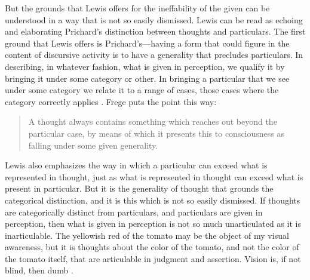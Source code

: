 \documentclass[12pt]{article}
\begin{document}
But the grounds that Lewis offers for the ineffability of the given can be understood in a way that is not so easily dismissed. Lewis can be read as echoing and elaborating Prichard's \citeyearpar[44]{Prichard:1909yg} distinction between thoughts and particulars. The first ground that Lewis offers is Prichard's---having a form that could figure in the content of discursive activity is to have a generality that precludes particulars. In describing, in whatever fashion, what is given in perception, we qualify it by bringing it under some category or other. In bringing a particular that we see under some category we relate it to a range of cases, those cases where the category correctly applies \citep[see][]{Travis:2005ys,Travis:2008uq}. Frege puts the point this way:
\begin{quote}
	A thought always contains something which reaches out beyond the particular case, by means of which it presents this to consciousness as falling under some given generality. \citep[4]{Frege:1882uq}
\end{quote}
Lewis also emphasizes the way in which a particular can exceed what is represented in thought, just as what is represented in thought can exceed what is present in particular. But it is the generality of thought that grounds the categorical distinction, and it is this which is not so easily dismissed. If thoughts are categorically distinct from particulars, and particulars are given in perception, then what is given in perception is not so much unarticulated as it is inarticulable. The yellowish red of the tomato may be the object of my visual awareness, but it is thoughts about the color of the tomato, and not the color of the tomato itself, that are articulable in judgment and assertion. Vision is, if not blind, then dumb \citep[see][]{Austin:1962lr,Travis:2004kx}.

\end{document}
